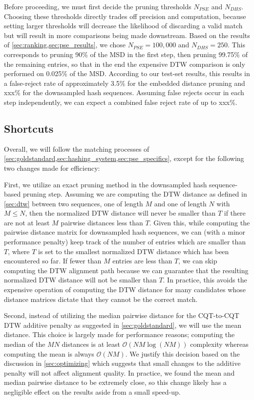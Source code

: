 Before proceeding, we must first decide the pruning thresholds $N_{PSE}$ and $N_{DHS}$.
Choosing these thresholds directly trades off precision and computation, because setting larger thresholds will decrease the likelihood of discarding a valid match but will result in more comparisons being made downstream.
Based on the results of \cref{sec:ranking,sec:pse_results}, we chose $N_{PSE} = 100,000$ and $N_{DHS} = 250$.
This corresponds to pruning 90\% of the MSD in the first step, then pruning 99.75\% of the remaining entries, so that in the end the expensive DTW comparison is only performed on 0.025\% of the MSD.
According to our test-set results, this results in a false-reject rate of approximately 3.5\% for the embedded distance pruning and xxx\% for the downsampled hash sequences.
Assuming false rejects occur in each step independently, we can expect a combined false reject rate of up to xxx\%.

\subsection{Shortcuts}

Overall, we will follow the matching processes of \cref{sec:goldstandard,sec:hashing_system,sec:pse_specifics}, except for the following two changes made for efficiency:

First, we utilize an exact pruning method in the downsampled hash sequence-based pruning step.
Assuming we are computing the DTW distance as defined in \cref{sec:dtw} between two sequences, one of length $M$ and one of length $N$ with $M \le N$, then the normalized DTW distance will never be smaller than $T$ if there are not at least $M$ pairwise distances less than $T$.
Given this, while computing the pairwise distance matrix for downsampled hash sequences, we can (with a minor performance penalty) keep track of the number of entries which are smaller than $T$, where $T$ is set to the smallest normalized DTW distance which has been encountered so far.
If fewer than $M$ entries are less than $T$, we can skip computing the DTW alignment path because we can guarantee that the resulting normalized DTW distance will not be smaller than $T$.
In practice, this avoids the expensive operation of computing the DTW distance for many candidates whose distance matrices dictate that they cannot be the correct match.

Second, instead of utilizing the median pairwise distance for the CQT-to-CQT DTW additive penalty as suggested in \cref{sec:goldstandard}, we will use the mean distance.
This choice is largely made for performance reasons; computing the median of the $MN$ distances is at least $\mathcal{O}( NM\log(NM) )$ complexity whereas computing the mean is always $\mathcal{O}(NM)$.
We justify this decision based on the discussion in \cref{sec:optimizing} which suggests that small changes to the additive penalty will not affect alignment quality.
In practice, we found the mean and median pairwise distance to be extremely close, so this change likely has a negligible effect on the results aside from a small speed-up.

